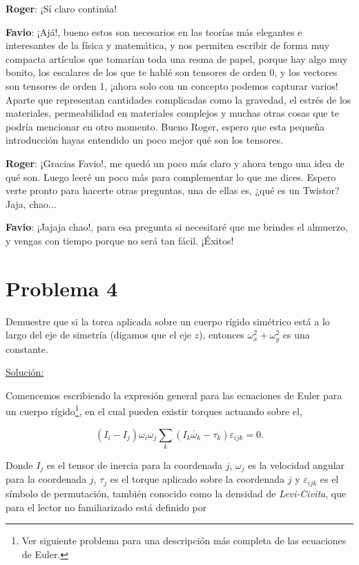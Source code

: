 \documentclass[a4paper,10pt]{article}
\numberwithin{equation}{section}
\begin{document}
\textbf{\color{ForestGreen}Roger}: ¡Sí claro continúa!

\textbf{\color{Blue}Favio}: ¡Ajá!, bueno estos son necesarios en las teorías 
más elegantes e interesantes de la física y matemática, y nos permiten escribir de forma
muy compacta artículos que tomarían toda una resma de papel, porque hay algo muy bonito,
los escalares de los que te hablé son tensores de orden 0, y los vectores son 
tensores de orden 1, ¡ahora solo con un concepto podemos capturar varios! Aparte que representan cantidades
complicadas como la gravedad, el estrés de los materiales, permeabilidad en materiales 
complejos y muchas otras cosas que te podría mencionar en otro momento. Bueno Roger, espero
que esta pequeña introducción hayas entendido un poco mejor qué son los tensores.

\textbf{\color{ForestGreen}Roger}: ¡Gracias Favio!, me quedó un poco más claro y ahora tengo una
idea de qué son. Luego leeré un poco más para complementar lo que me dices. Espero 
verte pronto para hacerte otras preguntas, una de ellas es, ¿qué es un Twistor? Jaja,
chao...

\textbf{\color{Blue}Favio}: ¡Jajaja chao!, para esa pregunta si necesitaré que me brindes 
el almuerzo, y vengas con tiempo porque no será tan fácil. ¡Éxitos!

\section{Problema 4}

Demuestre que si la torca aplicada sobre un cuerpo rígido simétrico está a lo largo 
del eje de simetría (digamos que el eje $z$), entonces $\omega_x^2 + \omega_y^2$ es 
una constante.

\vspace{.3cm}

\underline{Solución:} \vspace{.3cm}

Comencemos escribiendo la expresión general para las ecuaciones de Euler para un 
cuerpo rígido\footnote{Ver siguiente problema para una descripción más completa 
de las ecuaciones de Euler.}, en el cual pueden existir torques actuando sobre el,

\begin{equation}
 (I_i - I_j) \omega_i \omega_j \sum_k (I_k\dot{\omega_k}- \tau_k) \varepsilon_{ijk} = 0.
\end{equation}

Donde $I_j$ es el tensor de inercia para la coordenada $j$, $\omega_j$ es la velocidad
angular para la coordenada $j$, $\tau_j$ es el torque aplicado sobre la coordenada 
$j$ y $\varepsilon_{ijk}$ es el símbolo de permutación, también conocido como la 
densidad de \emph{Levi-Civita}, que para el lector no familiarizado está definido 
por 
\end{document}
